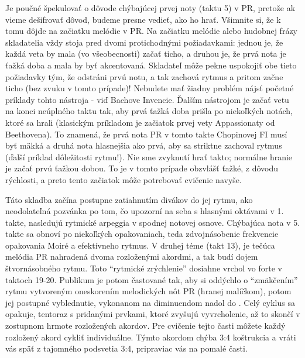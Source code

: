 Je poučné špekulovať o dôvode chýbajúcej prvej noty (taktu 5) v PR, pretože ak vieme dešifrovať dôvod, budeme presne vedieť, ako ho hrať. Všimnite si, že k tomu dôjde na začiatku melódie v PR. Na začiatku melódie alebo hudobnej frázy skladatelia vždy stoja pred dvomi protichodnými požiadavkami: jednou je, že každá veta by mala (vo všeobecnosti) začať ticho, a druhou je, že prvá nota je ťažká doba a mala by byť akcentovaná. Skladateľ môže pekne uspokojiť obe tieto požiadavky tým, že odstráni prvú notu, a tak zachová rytmus a pritom začne ticho (bez zvuku v tomto prípade)! Nebudete mať žiadny problém nájsť početné príklady tohto nástroja - viď Bachove Invencie. Ďalším nástrojom je začať vetu na konci neúplného taktu tak, aby prvá ťažká doba prišla po niekoľkých notách, ktoré sa hrali (klasickým príkladom je začiatok prvej vety Appassionaty od Beethovena). To znamená, že prvá nota PR v tomto takte Chopinovej FI musí byť mäkká a druhá nota hlasnejšia ako prvá, aby sa striktne zachoval rytmus (ďalší príklad dôležitosti rytmu!). Nie sme zvyknutí hrať takto; normálne hranie je začať prvú ťažkou dobou. To je v tomto prípade obzvlášť ťažké, z dôvodu rýchlosti, a preto tento začiatok môže potrebovať cvičenie navyše.

Táto skladba začína postupne zatiahnutím divákov do jej rytmu, ako neodolateľná pozvánka po tom, čo upozorní na seba s hlasnými oktávami v 1. takte, nasledujú rytmické arpeggia v spodnej notovej osnove. Chýbajúca nota v 5. takte sa obnoví po niekoľkých opakovaniach, teda zdvojnásobenie frekvencie opakovania Moiré a efektívneho rytmus. V druhej téme (takt 13), je tečúca melódia PR nahradená dvoma rozloženými akordmi, a tak budí dojem štvornásobného rytmu. Toto “rytmické zrýchlenie” dosiahne vrchol vo forte v taktoch 19-20. Publikum je potom častované tak, aby si oddýchlo o “zmäkčením” rytmu vytvoreným oneskorením melodických nôt PR (hranej malíčkom), potom jej postupné vyblednutie, vykonanom na diminuendom nadol do . Celý cyklus sa opakuje, tentoraz s pridanými prvkami, ktoré zvyšujú vyvrcholenie, až to skončí v zostupnom hrmote rozložených akordov. Pre cvičenie tejto časti môžete každý rozložený akord cykliť individuálne. Týmto akordom chýba 3:4 koštrukcia a vráti vás späť z tajomného podsvetia 3:4, pripraviac vás na pomalé časti.

